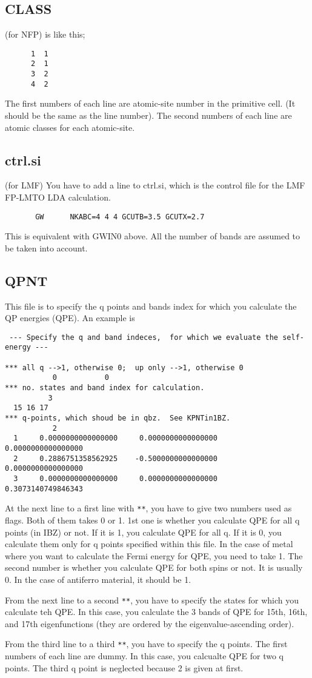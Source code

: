 \documentclass[a4paper,10pt,epsf,fleqn]{article}
\newcommand{\fx}[1]{\subsection{\sf #1\index{\sf #1}}}
\begin{document}
{\fx{CLASS}(for NFP) is like this;
{\baselineskip=2.6mm
\begin{verbatim}
      1  1
      2  1
      3  2
      4  2
\end{verbatim}}
The first numbers of each line are atomic-site number in the primitive cell.
(It should be the same as the line number). The second numbers of each line
are atomic classes for each atomic-site.

\fx{ctrl.si} (for LMF) You have to add a line to {\sf ctrl.si},
which is the control file for the LMF FP-LMTO LDA calculation.
{\baselineskip=2.6mm
\begin{verbatim}
       GW      NKABC=4 4 4 GCUTB=3.5 GCUTX=2.7
\end{verbatim}}
This is equivalent with {\sf GWIN0} above.
All the number of bands are assumed to be taken into account.

\fx{QPNT} This file is to specify the q points and bands index for which you calculate 
the QP energies (QPE). An example is
{\baselineskip=2.6mm
\begin{verbatim}
 --- Specify the q and band indeces,  for which we evaluate the self-energy ---

*** all q -->1, otherwise 0;  up only -->1, otherwise 0
           0           0
*** no. states and band index for calculation.
          3
  15 16 17 
*** q-points, which shoud be in qbz.  See KPNTin1BZ.
           2
  1     0.0000000000000000     0.0000000000000000     0.0000000000000000
  2     0.2886751358562925    -0.5000000000000000     0.0000000000000000
  3     0.0000000000000000     0.0000000000000000     0.3073140749846343
\end{verbatim}}
At the next line to a first line with {\tt ***},
you have to give two numbers used as flags. 
Both of them takes 0 or 1.
1st one is whether you calculate QPE for all q points (in IBZ) or not.
If it is 1, you calculate  QPE for all q. If it is 0, you calculate them only for
q points specified within this file. In the case of metal where you want to calculate the Fermi energy for QPE,
you need to take 1. The second number is whether you calculate QPE for
both spins or not. It is usually 0. In the case of antiferro material, it should be 1.

From the next line to a second {\tt ***},
you have to specify the states for which you calculate teh QPE.
In this case, you calculate the 3 bands of QPE for
15th, 16th, and 17th eigenfunctions (they are ordered by the eigenvalue-ascending order).

From the third line to a third {\tt ***},
you have to specify the q points. 
The first numbers of each line are dummy.
In this case, you calcualte QPE for two q points.
The third q point is neglected because 2 is given at first.


}
\end{document}

